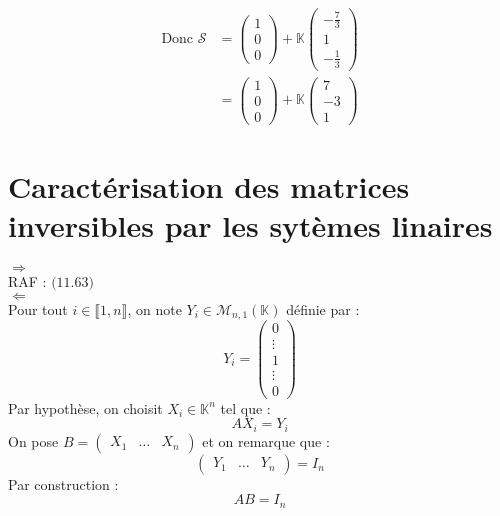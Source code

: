 \documentclass[../main.tex]{subfiles}
\begin{document}
\begin{align*}
    \text{Donc } \mathcal{S} &=
    \begin{pmatrix}
        1 \\
        0 \\
        0
    \end{pmatrix}
    + \mathbb{K}
    \begin{pmatrix}
        -\frac{7}{3} \\
        1 \\
        -\frac{1}{3}
    \end{pmatrix} \\
    &= 
    \begin{pmatrix}
        1 \\
        0 \\
        0
    \end{pmatrix}
    + \mathbb{K}
    \begin{pmatrix}
        7 \\
        -3 \\
        1
    \end{pmatrix}
\end{align*}

\setcounter{section}{64}
\section{Caractérisation des matrices inversibles par les sytèmes linaires}
$\boxed{\Rightarrow}$ \\
RAF : $\text{(11.63)}$ \\

$\boxed{\Leftarrow}$ \\
Pour tout $i \in \llbracket 1, n \rrbracket$, on note $Y_i \in \mathcal{M}_{n,1}(\mathbb{K})$ définie par :
$$Y_i = \begin{pmatrix}
    0 \\
    \vdots \\
    1 \\
    \vdots \\
    0
\end{pmatrix}$$
Par hypothèse, on choisit $X_i \in \mathbb{K}^n$ tel que :
$$AX_i = Y_i$$
On pose $B = \begin{pmatrix}
    X_1 & \ldots & X_n
\end{pmatrix}$ et on remarque que :
$$\begin{pmatrix}
    Y_1 & \ldots & Y_n
\end{pmatrix} = I_n$$
Par construction : 
$$AB = I_n$$
\end{document}

